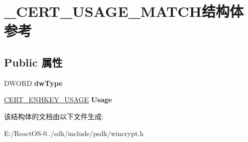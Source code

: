 \hypertarget{struct___c_e_r_t___u_s_a_g_e___m_a_t_c_h}{}\section{\+\_\+\+C\+E\+R\+T\+\_\+\+U\+S\+A\+G\+E\+\_\+\+M\+A\+T\+C\+H结构体 参考}
\label{struct___c_e_r_t___u_s_a_g_e___m_a_t_c_h}
\subsection*{Public 属性}
\begin{DoxyCompactItemize}
\item 
\mbox{\label{struct___c_e_r_t___u_s_a_g_e___m_a_t_c_h_ae163d20140ec12ea981a8c1ace77f81b}} 
D\+W\+O\+RD {\bfseries dw\+Type}
\item 
\mbox{\label{struct___c_e_r_t___u_s_a_g_e___m_a_t_c_h_af6070ae0722e0633e5e5123925d521e9}} 
\hyperlink{struct___c_t_l___u_s_a_g_e}{C\+E\+R\+T\+\_\+\+E\+N\+H\+K\+E\+Y\+\_\+\+U\+S\+A\+GE} {\bfseries Usage}
\end{DoxyCompactItemize}


该结构体的文档由以下文件生成\+:\begin{DoxyCompactItemize}
\item 
E\+:/\+React\+O\+S-\/0../sdk/include/psdk/wincrypt.\+h\end{DoxyCompactItemize}
